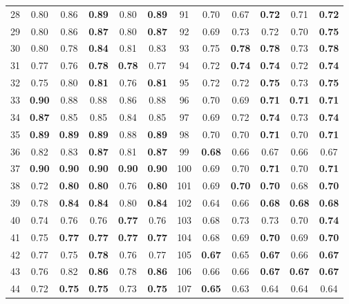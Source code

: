 \documentclass{article}
\begin{document}
{\begin{longtable}{cccccc@{\qquad}cccccc}
28 & 0.80 & 0.86 & \textbf{0.89} & 0.80 & \textbf{0.89} & 91 & 0.70 & 0.67 & \textbf{0.72} & 0.71 & \textbf{0.72} \\
29 & 0.80 & 0.86 & \textbf{0.87} & 0.80 & \textbf{0.87} & 92 & 0.69 & 0.73 & 0.72 & 0.70 & \textbf{0.75} \\
30 & 0.80 & 0.78 & \textbf{0.84} & 0.81 & 0.83 & 93 & 0.75 & \textbf{0.78} & \textbf{0.78} & 0.73 & \textbf{0.78} \\
31 & 0.77 & 0.76 & \textbf{0.78} & \textbf{0.78} & 0.77 & 94 & 0.72 & \textbf{0.74} & \textbf{0.74} & 0.72 & \textbf{0.74} \\
32 & 0.75 & 0.80 & \textbf{0.81} & 0.76 & \textbf{0.81} & 95 & 0.72 & 0.72 & \textbf{0.75} & 0.73 & \textbf{0.75} \\
33 & \textbf{0.90} & 0.88 & 0.88 & 0.86 & 0.88 & 96 & 0.70 & 0.69 & \textbf{0.71} & \textbf{0.71} & \textbf{0.71} \\
34 & \textbf{0.87} & 0.85 & 0.85 & 0.84 & 0.85 & 97 & 0.69 & 0.72 & \textbf{0.74} & 0.73 & \textbf{0.74} \\
35 & \textbf{0.89} & \textbf{0.89} & \textbf{0.89} & 0.88 & \textbf{0.89} & 98 & 0.70 & 0.70 & \textbf{0.71} & 0.70 & \textbf{0.71} \\
36 & 0.82 & 0.83 & \textbf{0.87} & 0.81 & \textbf{0.87} & 99 & \textbf{0.68} & 0.66 & 0.67 & 0.66 & 0.67 \\
37 & \textbf{0.90} & \textbf{0.90} & \textbf{0.90} & \textbf{0.90} & \textbf{0.90} & 100 & 0.69 & 0.70 & \textbf{0.71} & 0.70 & \textbf{0.71} \\
38 & 0.72 & \textbf{0.80} & \textbf{0.80} & 0.76 & \textbf{0.80} & 101 & 0.69 & \textbf{0.70} & \textbf{0.70} & 0.68 & \textbf{0.70} \\
39 & 0.78 & \textbf{0.84} & \textbf{0.84} & 0.80 & \textbf{0.84} & 102 & 0.64 & 0.66 & \textbf{0.68} & \textbf{0.68} & \textbf{0.68} \\
40 & 0.74 & 0.76 & 0.76 & \textbf{0.77} & 0.76 & 103 & 0.68 & 0.73 & 0.73 & 0.70 & \textbf{0.74} \\
41 & 0.75 & \textbf{0.77} & \textbf{0.77} & \textbf{0.77} & \textbf{0.77} & 104 & 0.68 & 0.69 & \textbf{0.70} & 0.69 & \textbf{0.70} \\
42 & 0.77 & 0.75 & \textbf{0.78} & 0.76 & 0.77 & 105 & \textbf{0.67} & 0.65 & \textbf{0.67} & 0.66 & \textbf{0.67} \\
43 & 0.76 & 0.82 & \textbf{0.86} & 0.78 & \textbf{0.86} & 106 & 0.66 & 0.66 & \textbf{0.67} & \textbf{0.67} & \textbf{0.67} \\
44 & 0.72 & \textbf{0.75} & \textbf{0.75} & 0.73 & \textbf{0.75} & 107 & \textbf{0.65} & 0.63 & 0.64 & 0.64 & 0.64 \\

\end{longtable}}
\end{document}
